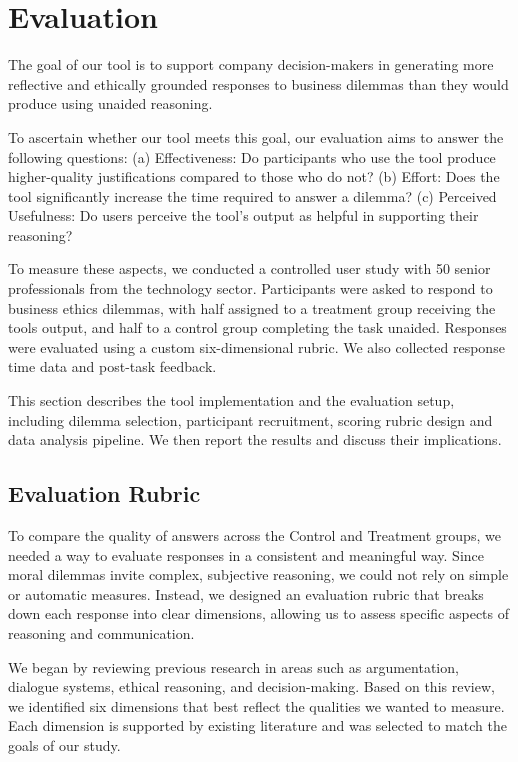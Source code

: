 \section{Evaluation}

The goal of our tool is to support company decision-makers in generating more reflective and ethically grounded responses to business dilemmas than they would produce using unaided reasoning.

To ascertain whether our tool meets this goal, our evaluation aims to answer the following questions:
(a) Effectiveness: Do participants who use the tool produce higher-quality justifications compared to those who do not?
(b) Effort: Does the tool significantly increase the time required to answer a dilemma?
(c) Perceived Usefulness: Do users perceive the tool's output as helpful in supporting their reasoning?

To measure these aspects, we conducted a controlled user study with 50 senior professionals from the technology sector. Participants were asked to respond to business ethics dilemmas, with half assigned to a treatment group receiving the tools output, and half to a control group completing the task unaided. Responses were evaluated using a custom six-dimensional rubric. We also collected response time data and post-task feedback.

This section describes the tool implementation and the evaluation setup, including dilemma selection, participant recruitment, scoring rubric design and data analysis pipeline. We then report the results and discuss their implications.







\subsection{Evaluation Rubric}
To compare the quality of answers across the Control and Treatment groups, we needed a way to evaluate responses in a consistent and meaningful way. Since moral dilemmas invite complex, subjective reasoning, we could not rely on simple or automatic measures. Instead, we designed an evaluation rubric that breaks down each response into clear dimensions, allowing us to assess specific aspects of reasoning and communication.

We began by reviewing previous research in areas such as argumentation, dialogue systems, ethical reasoning, and decision-making. Based on this review, we identified six dimensions that best reflect the qualities we wanted to measure. Each dimension is supported by existing literature and was selected to match the goals of our study.

